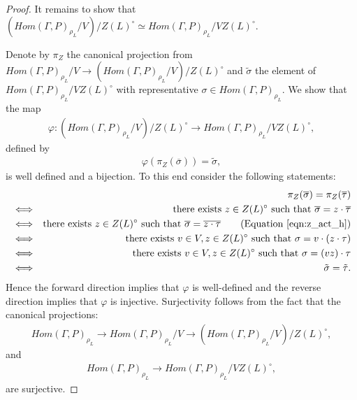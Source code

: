 \begin{proof}
  It remains to show that $\left(Hom(\Gamma, P)_{\rho_L}/V\right)/Z(L)^\circ \simeq Hom(\Gamma, P)_{\rho_L}/VZ(L)^\circ$.

  Denote by $\pi_Z$ the canonical projection from $Hom(\Gamma, P)_{\rho_L}/V \rightarrow \left( Hom(\Gamma, P)_{\rho_L}/V \right)/Z(L)^\circ$ and $\tilde{\sigma}$ the element of $Hom(\Gamma, P)_{\rho_L}/VZ(L)^\circ$ with representative $\sigma \in Hom(\Gamma, P)_{\rho_L}$. We show that the map
  \begin{eqnarray*}
    \varphi: (Hom(\Gamma, P)_{\rho_L}/V)/Z(L)^\circ \rightarrow Hom(\Gamma, P)_{\rho_L}/VZ(L)^\circ,
  \end{eqnarray*}
  defined by
  \begin{eqnarray*}
    \varphi(\pi_Z(\overline{\sigma})) = \tilde{\sigma},
  \end{eqnarray*}
  is well defined and a bijection. To this end consider the following statements:
  \begin{eqnarray*}
    && \pi_Z(\overline{\sigma}) = \pi_Z(\overline{\tau}) \\
    &\Longleftrightarrow& \textrm{there exists } z \in Z(L)^\circ \textrm{ such that } \overline{\sigma} = z \cdot \overline{\tau} \\
    &\Longleftrightarrow& \textrm{there exists } z \in Z(L)^\circ \textrm{ such that } \overline{\sigma} = \overline{z \cdot \tau} \qquad (\textrm{Equation } \ref{eqn:z_act_h}) \\
    &\Longleftrightarrow& \textrm{there exists } v \in V, z \in Z(L)^\circ \textrm{ such that } \sigma = v \cdot (z \cdot \tau) \\
    &\Longleftrightarrow& \textrm{there exists } v \in V, z \in Z(L)^\circ \textrm{ such that } \sigma = (vz) \cdot \tau \\
    &\Longleftrightarrow& \tilde{\sigma} = \tilde{\tau}.
  \end{eqnarray*}
  Hence the forward direction implies that $\varphi$ is well-defined and the reverse direction implies that $\varphi$ is injective. Surjectivity follows from the fact that the canonical projections:
  \begin{eqnarray*}
    Hom(\Gamma, P)_{\rho_L} \rightarrow Hom(\Gamma, P)_{\rho_L}/V \rightarrow (Hom(\Gamma, P)_{\rho_L}/V)/Z(L)^\circ, 
  \end{eqnarray*}
  and
  \begin{eqnarray*}
    Hom(\Gamma, P)_{\rho_L} \rightarrow Hom(\Gamma, P)_{\rho_L}/VZ(L)^\circ, 
  \end{eqnarray*}
  are surjective.
\end{proof}

